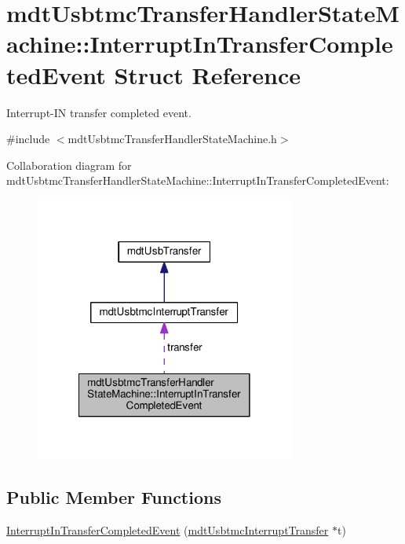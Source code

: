 \hypertarget{structmdt_usbtmc_transfer_handler_state_machine_1_1_interrupt_in_transfer_completed_event}{\section{mdt\-Usbtmc\-Transfer\-Handler\-State\-Machine\-:\-:Interrupt\-In\-Transfer\-Completed\-Event Struct Reference}
\label{structmdt_usbtmc_transfer_handler_state_machine_1_1_interrupt_in_transfer_completed_event}
}


Interrupt-\/\-I\-N transfer completed event.  




{\ttfamily \#include $<$mdt\-Usbtmc\-Transfer\-Handler\-State\-Machine.\-h$>$}



Collaboration diagram for mdt\-Usbtmc\-Transfer\-Handler\-State\-Machine\-:\-:Interrupt\-In\-Transfer\-Completed\-Event\-:
\nopagebreak
\begin{figure}[H]
\begin{center}
\leavevmode
\includegraphics[width=242pt]{structmdt_usbtmc_transfer_handler_state_machine_1_1_interrupt_in_transfer_completed_event__coll__graph}
\end{center}
\end{figure}
\subsection*{Public Member Functions}
\begin{DoxyCompactItemize}
\item 
\hyperlink{structmdt_usbtmc_transfer_handler_state_machine_1_1_interrupt_in_transfer_completed_event_a04e328b62d4f4cc0aca58756708b0019}{Interrupt\-In\-Transfer\-Completed\-Event} (\hyperlink{classmdt_usbtmc_interrupt_transfer}{mdt\-Usbtmc\-Interrupt\-Transfer} $\ast$t)
\end{DoxyCompactItemize}
